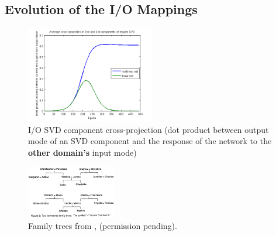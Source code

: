\documentclass[10pt,letterpaper]{article}
\begin{document}
\subsection{Evolution of the I/O Mappings}
%
\begin{figure}
\centering
\includegraphics[width=0.5\textwidth]{figures/SVD_cross_projection_learning.png}
\caption{I/O SVD component cross-projection (dot product between output mode of an SVD component and the response of the network to the \textbf{other domain's} input mode)}
\label{SVD_cross_projection_learning}
\end{figure}
\begin{figure}
\centering
\includegraphics[width=0.35\textwidth]{figures/hinton_family_tree_figure.png}
\caption{Family trees from \citet{Hinton1986}, (permission pending).}
\label{hinton_family_tree_figure}
\end{figure}
\end{document}

